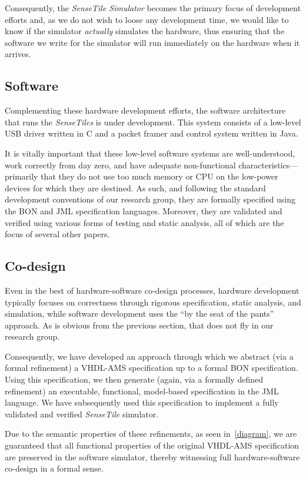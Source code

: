 \documentclass{article}
\newcommand{\ST}{\emph{SenseTile}\xspace}
\newcommand{\STs}{\emph{SenseTiles}\xspace}
\newcommand{\STS}{\emph{SenseTile Simulator}\xspace}
\begin{document}
Consequently, the \STS becomes the primary focus of development
efforts and, as we do not wish to loose any development time, we would
like to know if the simulator \emph{actually} simulates the hardware,
thus ensuring that the software we write for the simulator will run
immediately on the hardware when it arrives.

\subsection{Software}
\label{subsec:software}

Complementing these hardware development efforts, the software
architecture that runs the \STs is under development.  This system
consists of a low-level USB driver written in C and a packet framer
and control system written in Java.

It is vitally important that these low-level software systems are
well-understood, work correctly from day zero, and have adequate
non-functional characteristics---primarily that they do not use too
much memory or CPU on the low-power devices for which they are
destined.  As such, and following the standard development conventions
of our research group, they are formally specified using the BON and
JML specification languages.  Moreover, they are validated and
verified using various forms of testing and static analysis, all of
which are the focus of several other papers.

\subsection{Co-design}
\label{subsec:co-design}

Even in the best of hardware-software co-design processes, hardware
development typically focuses on correctness through rigorous
specification, static analysis, and simulation, while software
development uses the ``by the seat of the pants'' approach.  As is
obvious from the previous section, that does not fly in our research
group.

Consequently, we have developed an approach through which we abstract
(via a formal refinement) a VHDL-AMS specification up to a formal BON
specification.  Using this specification, we then generate (again, via
a formally defined refinement) an executable, functional, model-based
specification in the JML language.  We have subsequently used this
specification to implement a fully validated and verified \ST
simulator.  

Due to the semantic properties of these refinements, as seen
in~\autoref{diagram}, we are guaranteed that all functional properties
of the original VHDL-AMS specification are preserved in the software
simulator, thereby witnessing full hardware-software co-design in a
formal sense.
\end{document}
